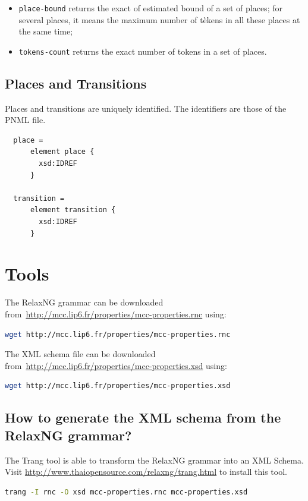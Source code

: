 \documentclass[10pt,english,a4paper]{article}
\begin{document}
\begin{itemize}
  \item \lstinline!place-bound! returns the exact of estimated bound of a set of places;
    for several places, it means the maximum number of tèkens in all these places at the same
    time;
  \item \lstinline!tokens-count! returns the exact number of tokens in a set of places.
\end{itemize}

\subsection{Places and Transitions}

Places and transitions are uniquely identified. The identifiers are those of the PNML file.

\begin{lstlisting}
  place =
      element place {
        xsd:IDREF
      }

  transition =
      element transition {
        xsd:IDREF
      }
\end{lstlisting}




\section{Tools}
The RelaxNG grammar can be downloaded from~\url{http://mcc.lip6.fr/properties/mcc-properties.rnc} using:
\begin{lstlisting}[language=sh]
  wget http://mcc.lip6.fr/properties/mcc-properties.rnc
\end{lstlisting}

The XML schema file can be downloaded from~\url{http://mcc.lip6.fr/properties/mcc-properties.xsd} using:
\begin{lstlisting}[language=sh]
  wget http://mcc.lip6.fr/properties/mcc-properties.xsd
\end{lstlisting}

\subsection{How to generate the XML schema from the RelaxNG grammar?}
The Trang tool is able to transform the RelaxNG grammar into an XML Schema.
Visit \url{http://www.thaiopensource.com/relaxng/trang.html} to install this tool.

\begin{lstlisting}[language=sh]
  trang -I rnc -O xsd mcc-properties.rnc mcc-properties.xsd
\end{lstlisting}
\end{document}
